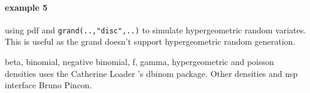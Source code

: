 \begin{examples}
\paragraph{example 5} using pdf and \verb+grand(..,"disc",..)+ to simulate
hypergeometric random variates. This is useful as the grand doesn't
support hypergeometric random generation.
\begin{program}
\end{program}

\end{examples}



\begin{manseealso}
\end{manseealso}


\begin{authors}
  beta, binomial, negative binomial, f, gamma, hypergeometric and 
  poisson densities uses the Catherine Loader 's dbinom package. Other 
  densities and nsp interface Bruno Pincon.
\end{authors}

